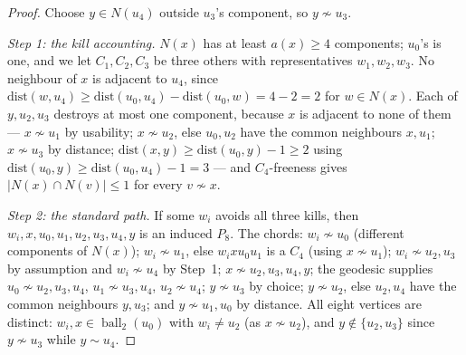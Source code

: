 \documentclass[11pt]{article}
\theoremstyle{plain}
\theoremstyle{definition}
\theoremstyle{remark}
\numberwithin{equation}{section}
\newcommand{\ball}{\operatorname{ball}}
\begin{document}
\begin{proof}
Choose $y \in N(u_4)$ outside $u_3$'s component, so $y \not\sim u_3$.

\emph{Step 1: the kill accounting.} $N(x)$ has at least $a(x)\ge 4$ components; $u_0$'s is
one, and we let $C_1,C_2,C_3$ be three others with representatives $w_1,w_2,w_3$. No
neighbour of $x$ is adjacent to $u_4$, since
$\mathrm{dist}(w,u_4)\ge \mathrm{dist}(u_0,u_4)-\mathrm{dist}(u_0,w) = 4-2 = 2$ for
$w \in N(x)$. Each of $y, u_2, u_3$ destroys at most one component, because $x$ is adjacent
to none of them --- $x \not\sim u_1$ by usability; $x\not\sim u_2$, else $u_0,u_2$ have the
common neighbours $x,u_1$; $x\not\sim u_3$ by distance;
$\mathrm{dist}(x,y)\ge\mathrm{dist}(u_0,y)-1 \ge 2$ using
$\mathrm{dist}(u_0,y)\ge \mathrm{dist}(u_0,u_4)-1 = 3$ --- and $C_4$-freeness gives
$|N(x)\cap N(v)|\le 1$ for every $v \not\sim x$.

\emph{Step 2: the standard path.} If some $w_i$ avoids all three kills, then
$w_i, x, u_0, u_1, u_2, u_3, u_4, y$ is an induced $P_8$. The chords: $w_i \not\sim u_0$
(different components of $N(x)$); $w_i \not\sim u_1$, else $w_i x u_0 u_1$ is a $C_4$ (using
$x \not\sim u_1$); $w_i \not\sim u_2,u_3$ by assumption and $w_i\not\sim u_4$ by Step~1;
$x \not\sim u_2,u_3,u_4,y$; the geodesic supplies $u_0\not\sim u_2,u_3,u_4$,
$u_1\not\sim u_3,u_4$, $u_2 \not\sim u_4$; $y \not\sim u_3$ by choice; $y \not\sim u_2$, else
$u_2,u_4$ have the common neighbours $y,u_3$; and $y \not\sim u_1,u_0$ by distance. All eight
vertices are distinct: $w_i, x \in \ball_2(u_0)$ with $w_i \ne u_2$ (as $x \not\sim u_2$),
and $y \notin\{u_2,u_3\}$ since $y \not\sim u_3$ while $y \sim u_4$.


\end{proof}
\end{document}
